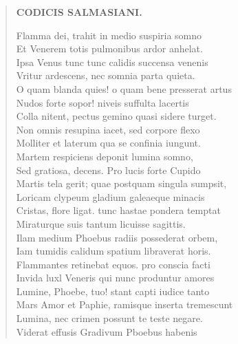 \documentclass[11pt, a4paper]{report}
\begin{document}
\begin{verse}
    \begin{center} \textbf{CODICIS SALMASIANI.} \end{center} \marginpar{[207]} Flamma dei, trahit in medio suspiria somno \\ Et Venerem totis pulmonibus ardor anhelat. \\ Ipsa Venus tunc tunc calidis succensa venenis \\ Vritur ardescens, nec somnia parta quieta. \\ O quam blanda quies! o quam bene presserat artus \\ Nudos forte sopor! niveis suffulta lacertis \\ Colla nitent, pectus gemino quasi sidere turget. \\ Non omnis resupina iacet, sed corpore flexo \\ Molliter et laterum qua se confinia iungunt. \\ Martem respiciens deponit lumina somno, \\ Sed gratiosa, decens. Pro lucis forte Cupido \\ Martis tela gerit; quae postquam singula  \lbrack sumpsit, \\ Loricam clypeum gladium galeaeque minacis \\ Cristas, flore ligat. tunc hastae pondera temptat \\ Miraturque suis tantum licuisse sagittis. \\ Ilam medium Phoebus radiis possederat orbem, \\ Iam tumidis calidum spatium libraverat horis. \\ Flammantes retinebat equos. pro conscia facti \\ Invida luxl Veneris qui nunc produntur amores \\ Lumine, Phoebe, tuo! stant capti iudice tanto \\ Mars Amor et Paphie, ramisque inserta tremescunt \\ Lumina, nec crimen possunt te teste negare. \\ Viderat effusis Gradivum Pboebus habenis \\ 
      \end{verse}
  
\end{document}

